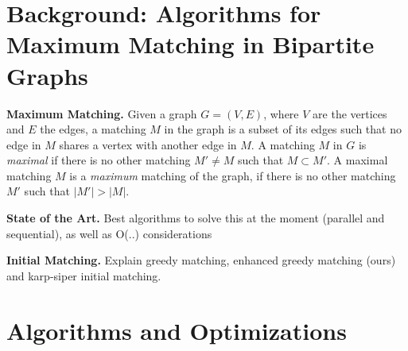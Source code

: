 \documentclass[letterpaper]{article}
\newcommand{\mypar}[1]{{\bf #1.}}
\begin{document}
\section{Background: Algorithms for Maximum Matching in Bipartite Graphs}\label{sec:background}

\mypar{Maximum Matching}
Given a graph $G = (V, E)$, where $V$ are the vertices and $E$ the edges, a matching $M$ in the graph is a subset of its edges such that no edge in $M$ shares a vertex with another edge in $M$. A matching $M$ in $G$ is \textit{maximal} if there is no other matching $M' \neq M$ such that $M \subset M'$. A maximal matching $M$ is a \textit{maximum} matching of the graph, if there is no other matching $M'$ such that $\lvert M' \rvert > \lvert M \rvert$. 

\mypar{State of the Art}
Best algorithms to solve this at the moment (parallel and sequential), as well as O(..) considerations

\mypar{Initial Matching}
Explain greedy matching, enhanced greedy matching (ours) and karp-siper initial matching.

%
%
%


\section{Algorithms and Optimizations}\label{sec:pfopt}
%
%
%
\end{document}
